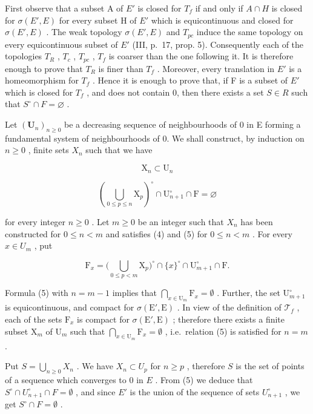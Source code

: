 First observe that a subset A of \(E'\) is closed for \(T_{f}\) if and only if \(A \cap H\) is closed for \(\sigma(E', E)\) for every subset H of \(E'\) which is equicontinuous and closed for \(\sigma(E', E)\) . The weak topology \(\sigma(E', E)\) and \(T_{pc}\) induce the same topology on every equicontinuous subset of \(E'\) (III, p.~17, prop. 5). Consequently each of the topologies \(T_{R}\) , \(T_{c}\) , \(T_{pc}\) , \(T_{f}\) is coarser than the one following it. It is therefore enough to prove that \(T_{R}\) is finer than \(T_{f}\) . Moreover, every translation in \(E'\) is a homeomorphism for \(T_{f}\) . Hence it is enough to prove that, if F is a subset of \(E'\) which is closed for \(T_{f}\) , and does not contain 0, then there exists a set \(S \in R\) such that \(S^{\circ} \cap F = \varnothing\) .

Let \((\mathbf{U}_{n})_{n\geqslant0}\) be a decreasing sequence of neighbourhoods of 0 in E forming a fundamental system of neighbourhoods of 0. We shall construct, by induction on \(n\geqslant0\) , finite sets \(X_{n}\) such that we have

\[
\mathrm{X} _ {n} \subset \mathrm{U} _ {n}\tag{4}
\]

\[
\left(\bigcup_ {0 \leqslant p \leqslant n} \mathrm{X} _ {p}\right) ^ {\circ} \cap \mathrm{U} _ {n + 1} ^ {\circ} \cap \mathrm{F} = \varnothing\tag{5}
\]

for every integer \(n \geqslant 0\) . Let \(m \geqslant 0\) be an integer such that \(X_{n}\) has been constructed for \(0 \leqslant n < m\) and satisfies (4) and (5) for \(0 \leqslant n < m\) . For every \(x \in U_{m}\) , put

\[
\mathrm{F} _ {x} = \big (\bigcup_ {0 \leqslant p <   m} \mathrm{X} _ {p} \big) ^ {\circ} \cap \{x \} ^ {\circ} \cap \mathrm{U} _ {m + 1} ^ {\circ} \cap \mathrm{F}.
\]

Formula (5) with \(n = m - 1\) implies that \(\bigcap_{x\in \mathrm{U}_m}\mathrm{F}_x = \emptyset\) . Further, the set \(\mathrm{U}_{m + 1}^{\circ}\) is equicontinuous, and compact for \(\sigma (\mathrm{E}',\mathrm{E})\) . In view of the definition of \(\mathcal{T}_f\) , each of the sets \(\mathrm{F}_x\) is compact for \(\sigma (\mathrm{E}',\mathrm{E})\) ; therefore there exists a finite subset \(\mathrm{X}_m\) of \(\mathrm{U}_m\) such that \(\bigcap_{x\in \mathrm{U}_m}\mathrm{F}_x = \emptyset\) , i.e.~relation (5) is satisfied for \(n = m\) .

Put \(S = \bigcup_{n\geqslant 0}X_n\) . We have \(X_{n}\subset U_{p}\) for \(n\geqslant p\) , therefore \(S\) is the set of points of a sequence which converges to 0 in \(E\) . From (5) we deduce that \(S^{\circ}\cap U_{n + 1}^{\circ}\cap F = \emptyset\) , and since \(E'\) is the union of the sequence of sets \(U_{n + 1}^{\circ}\) , we get \(S^{\circ}\cap F = \emptyset\) .

